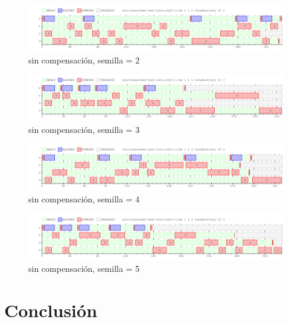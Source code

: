 \documentclass[a4paper]{article}
\begin{document}
\begin{figure}[H]
\begin{center}
\includegraphics[scale=0.4]{imagenes/ej10-1-s-s-2.png}
\end{center}
\caption{sin compensación, semilla = 2}
\end{figure}

\begin{figure}[H]
\begin{center}
\includegraphics[scale=0.4]{imagenes/ej10-1-s-s-3.png}
\end{center}
\caption{sin compensación, semilla = 3}
\end{figure}

\begin{figure}[H]
\begin{center}
\includegraphics[scale=0.4]{imagenes/ej10-1-s-s-4.png}
\end{center}
\caption{sin compensación, semilla = 4}
\end{figure}

\begin{figure}[H]
\begin{center}
\includegraphics[scale=0.4]{imagenes/ej10-1-s-s-5.png}
\end{center}
\caption{sin compensación, semilla = 5}
\end{figure}

\section{Conclusión}
\end{document}
